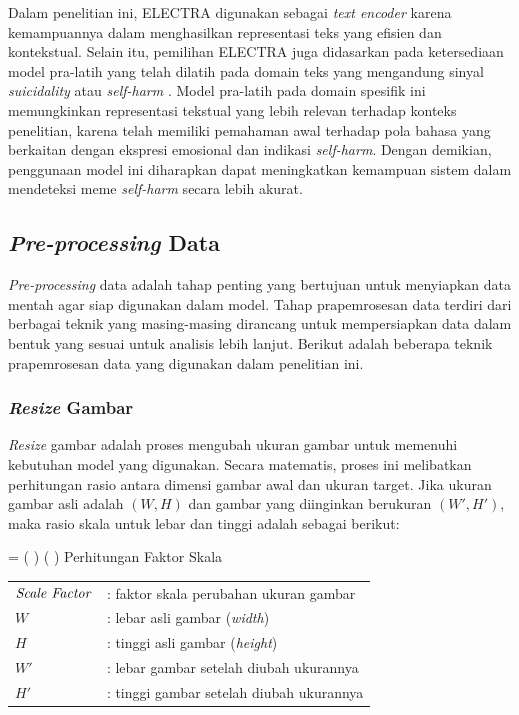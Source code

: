Dalam penelitian ini, ELECTRA digunakan sebagai \textit{text encoder} karena kemampuannya dalam menghasilkan representasi teks yang efisien dan kontekstual. 
Selain itu, pemilihan ELECTRA juga didasarkan pada ketersediaan model pra-latih yang telah dilatih pada domain teks yang mengandung sinyal \textit{suicidality} atau \textit{self-harm} \cite{sentinet_suicidality}. Model pra-latih pada domain spesifik ini memungkinkan representasi tekstual yang lebih relevan terhadap konteks penelitian, karena telah memiliki pemahaman awal terhadap pola bahasa yang berkaitan dengan ekspresi emosional dan indikasi \textit{self-harm}. Dengan demikian, penggunaan model ini diharapkan dapat meningkatkan kemampuan sistem dalam mendeteksi meme \textit{self-harm} secara lebih akurat.


\subsection{\textit{Pre-processing} Data} \label{II.teori11}
\textit{Pre-processing} data adalah tahap penting  yang bertujuan untuk menyiapkan data mentah agar siap digunakan dalam model. Tahap prapemrosesan data terdiri dari berbagai teknik yang masing-masing dirancang untuk mempersiapkan data dalam bentuk yang sesuai untuk analisis lebih lanjut. Berikut adalah beberapa teknik prapemrosesan data yang digunakan dalam penelitian ini.


\subsubsection{\textit{Resize} Gambar} \label{II.teori11.1}
\textit{Resize} gambar adalah proses mengubah ukuran gambar untuk memenuhi kebutuhan model yang digunakan. Secara matematis, proses ini melibatkan perhitungan rasio antara dimensi gambar awal dan ukuran target. Jika ukuran gambar asli adalah $(W, H)$ dan gambar yang diinginkan berukuran $(W', H')$, maka rasio skala untuk lebar dan tinggi adalah sebagai berikut: 
\\

\begin{equationcaptioned}{
	 = \left(  \right) \left(  \right)
}{
Perhitungan Faktor Skala
}
\end{equationcaptioned}

\noindent
{}

\begin{tabular}{l l}
$\text{\textit{Scale Factor}}$ & : faktor skala perubahan ukuran gambar \\ 
$W$ & : lebar asli gambar (\textit{width}) \\ 
$H$ & : tinggi asli gambar (\textit{height}) \\ 
$W'$ & : lebar gambar setelah diubah ukurannya \\ 
$H'$ & : tinggi gambar setelah diubah ukurannya \\ 

\end{tabular} \\

